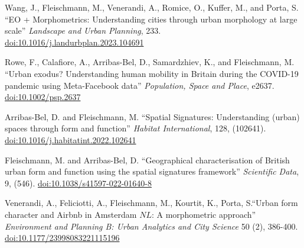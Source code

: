 \documentclass[11pt,a4paper]{report}
\begin{document}
\begin{tablist}
        \item[2023] \tab{}Wang, J., Fleischmann, M., Venerandi, A., Romice, O., Kuffer, M., and Porta, S. \enquote{EO + Morphometrics: Understanding cities through urban morphology at large scale} \textit{Landscape and Urban Planning}, 233. \href{https://doi.org/10.1016/j.landurbplan.2023.104691}{doi:10.1016/j.landurbplan.2023.104691}

        \item[2022] \tab{}Rowe, F., Calafiore, A., Arribas-Bel, D., Samardzhiev, K., and Fleischmann, M. \enquote{Urban exodus? Understanding human mobility in Britain during the COVID-19 pandemic using Meta-Facebook data} \textit{Population, Space and Place}, e2637. \href{https://doi.org/10.1002/psp.2637}{doi:10.1002/psp.2637}

        \item[2022] \tab{}Arribas-Bel, D. and Fleischmann, M. \enquote{Spatial Signatures: Understanding (urban) spaces through form and function} \textit{Habitat International}, 128, (102641). \href{https://doi.org/10.1016/j.habitatint.2022.102641}{doi:10.1016/j.habitatint.2022.102641}

        \item[2022] \tab{}Fleischmann, M. and Arribas-Bel, D. \enquote{Geographical characterisation of British urban form and function using the spatial signatures framework} \textit{Scientific Data}, 9, (546). \href{https://doi.org/10.1038/s41597-022-01640-8}{doi:10.1038/s41597-022-01640-8}

        \item[2022] \tab{}Venerandi, A., Feliciotti, A., Fleischmann, M., Kourtit, K., Porta, S.\enquote{Urban form character and Airbnb in Amsterdam \(NL\): A morphometric approach} \textit{Environment and Planning B: Urban Analytics and City Science} 50 (2), 386-400. \href{https://doi.org/10.1177/23998083221115196}{doi:10.1177/23998083221115196}




\end{tablist}
\end{document}
